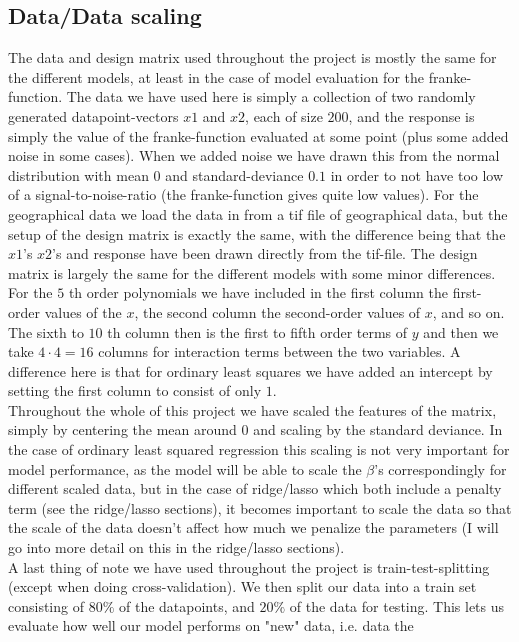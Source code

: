 \documentclass{article}
\begin{document}
\subsection{Data/Data scaling}
The data and design matrix used throughout the project is mostly the same for
the different models, at least in the case of model evaluation for the
franke-function. The data we have used here is simply a collection of two
randomly generated datapoint-vectors $x1$ and $x2$, each of size $200$, and the
response is simply the value of the franke-function evaluated at some point
(plus some added noise in some cases). When we added noise we have drawn this
from the normal distribution with mean $0$ and standard-deviance $0.1$ in order
to not have too low of a signal-to-noise-ratio (the franke-function gives quite
low values). For the geographical data we load the data in from a tif file of
geographical data, but the setup of the design matrix is exactly the same, with
the difference being that the $x1$'s $x2$'s and response have been drawn directly from the
tif-file. The design matrix is largely the same for the different models with
some minor differences.  For the $5$ th order polynomials we have included in
the first column the first-order values of the $x$, the second column the
second-order values of $x$, and so on. The sixth to $10$ th column then is the
first to fifth order terms of $y$ and then we take $4 \cdot 4 = 16$ columns for
interaction terms between the two variables. A difference here is that for
ordinary least squares we have added an intercept by setting the first column to
consist of only $1$.
\\
Throughout the whole of this project we have scaled the
features of the matrix, simply by centering the mean around $0$ and scaling by
the standard deviance. In the case of ordinary least squared regression this
scaling is not very important for model performance, as the model will be able
to scale the $\beta$'s correspondingly for different scaled data, but in the
case of ridge/lasso which both include a penalty term (see the ridge/lasso
sections), it becomes important to scale the data so that the scale of the data
doesn't affect how much we penalize the parameters (I will go into more detail
on this in the ridge/lasso sections).
\\
A last thing of note we have used throughout the project is train-test-splitting
(except when doing cross-validation). We then split our data into a train set
consisting of $80\%$ of the datapoints, and $20\%$ of the data for testing.
This lets us evaluate how well our model performs on "new" data, i.e. data the
\end{document}
